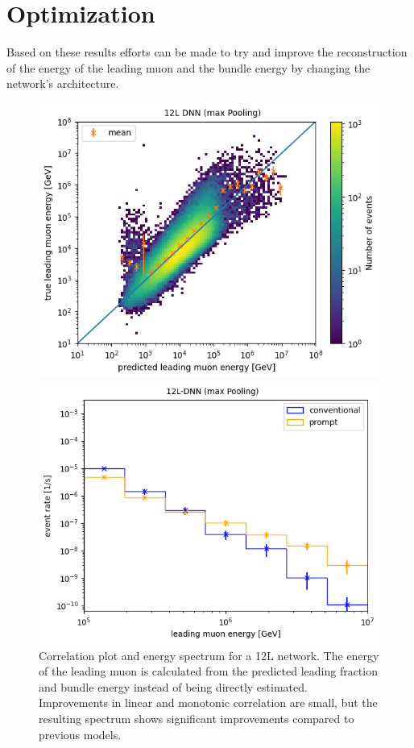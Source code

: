 \documentclass[
  tucolor,       %
  BCOR=12mm,     %
  parskip=half,  %
  open=any,      %
  cleardoublepage=plain,  %
]{tudothesis}
\begin{document}
\section{Optimization}
Based on these results efforts can be made to try and improve the reconstruction of the energy of the leading muon and the bundle energy by changing the network's architecture.
\begin{figure}
  \centering
  \begin{minipage}[t]{0.49\textwidth}
    \includegraphics[width=\textwidth]{Plots/Correlation leading 12L max}
  \end{minipage}
  \begin{minipage}[t]{0.49\textwidth}
    \includegraphics[width=\textwidth]{Plots/muon flux calculated 12L max}
  \end{minipage}
  \caption{Correlation plot and energy spectrum for a 12L network. The energy of the leading muon is calculated from the predicted leading fraction and bundle energy instead of being directly estimated. Improvements in linear and monotonic correlation are small, but the resulting spectrum shows significant improvements compared to previous models.}
  \label{fig:Correlation spectrum improved}
\end{figure}
\end{document}
